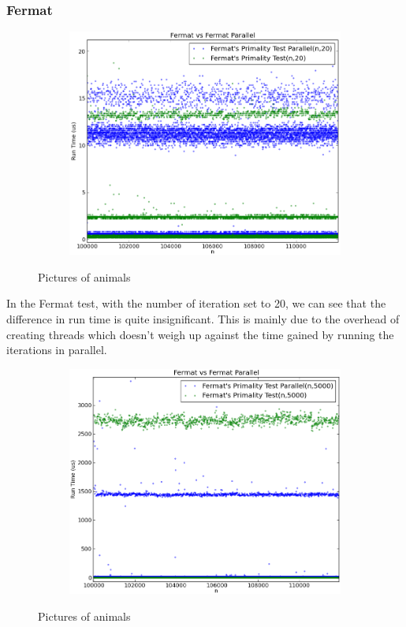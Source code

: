 \documentclass[compressed,final,notitlepage,narroweqnarray,inline,twoside,]{ieee}
\begin{document}
\subsubsection{Fermat}
\begin{figure}[H]
        \centering
        \begin{subfigure}[b]{0.5\textwidth}
                \includegraphics[width=\textwidth]{../images/FPT_FPTP_runtime}
                \label{fig:gull}
        \end{subfigure}
        \caption{Pictures of animals}\label{fig:animals}
\end{figure}
In the Fermat test, with the number of iteration set to 20, we can see that the difference in run time is quite insignificant. This is mainly due to the overhead of creating threads which doesn’t weigh up against the time gained by running the iterations in parallel. 
\begin{figure}[H]
        \centering
        \begin{subfigure}[b]{0.5\textwidth}
                \includegraphics[width=\textwidth]{../images/FPT_FPTP_large_runtime}
                \label{fig:gull}
        \end{subfigure}
        \caption{Pictures of animals}\label{fig:animals}
\end{figure}
\end{document}

